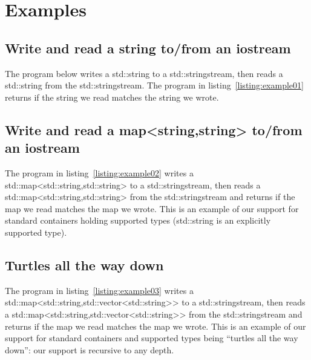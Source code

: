 \chapter{Examples}

\section{Write and read a {\ttfamily string} to/from an {\ttfamily iostream}}
The program below writes a {\ttfamily std::string} to a {\ttfamily
  std::stringstream}, then reads a {\ttfamily std::string} from the
{\ttfamily std::stringstream}.  The program in
listing~\ref{listing:example01} returns {} if the
string we read matches the string we wrote.

\begin{minipage}{\textwidth}

\end{minipage}

\pagebreak
\section{Write and read a {\ttfamily map<string,string>} to/from an {\ttfamily iostream}}
The program in listing~\ref{listing:example02} writes a
{\ttfamily std::map<std::string,std::string>} to a
{\ttfamily std::stringstream}, then reads a
{\ttfamily std::map<std::string,std::string>} from the
{\ttfamily std::stringstream} and returns {} if the map
we read matches the map we wrote.  This is an example of our support
for standard containers holding supported types ({\ttfamily std::string}
is an explicitly supported type).

\begin{minipage}{\textwidth}

\end{minipage}

% 

\pagebreak
\section{Turtles all the way down}
The program in listing~\ref{listing:example03} writes a
{\ttfamily std::map<std::string,std::vector<std::string>>}
to a {\ttfamily std::stringstream}, then reads a
{\ttfamily std::map<std::string,std::vector<std::string>>} from the
{\ttfamily std::stringstream} and returns {} if the map
we read matches the map we wrote.  This is an example of our support
for standard containers and supported types being ``turtles all the
way down'': our support is recursive to any depth.

